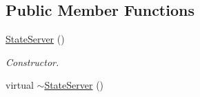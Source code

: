 \subsection*{Public Member Functions}
\begin{DoxyCompactItemize}
\item 
\hypertarget{class_state_server_a25f579ea466c99a9acc5b09afee655a3}{\hyperlink{class_state_server_a25f579ea466c99a9acc5b09afee655a3}{State\-Server} ()}\label{class_state_server_a25f579ea466c99a9acc5b09afee655a3}

\begin{DoxyCompactList}\small\item\em Constructor. \end{DoxyCompactList}\item 
\hypertarget{class_state_server_a7f828d9ae6acbbc581b65b18f8ead961}{virtual \hyperlink{class_state_server_a7f828d9ae6acbbc581b65b18f8ead961}{$\sim$\-State\-Server} ()}\label{class_state_server_a7f828d9ae6acbbc581b65b18f8ead961}


\end{DoxyCompactItemize}
